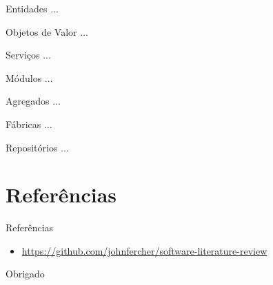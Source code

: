 \documentclass[aspectratio=169]{beamer}
\begin{document}
\begin{frame}{Entidades}	
	...
\end{frame}

\begin{frame}{Objetos de Valor}	
	...
\end{frame}

\begin{frame}{Serviços}	
	...
\end{frame}

\begin{frame}{Módulos}	
	...
\end{frame}

\begin{frame}{Agregados}	
	...
\end{frame}

\begin{frame}{Fábricas}	
	...
\end{frame}

\begin{frame}{Repositórios}	
	...
\end{frame}

\section{Referências}
\begin{frame}{Referências}	
	\begin{itemize}	
		\item \href{https://github.com/johnfercher/software-literature-review}{https://github.com/johnfercher/software-literature-review}
	\end{itemize}
\end{frame}

\begin{frame}[standout]
  	Obrigado		
\end{frame}
\end{document}
